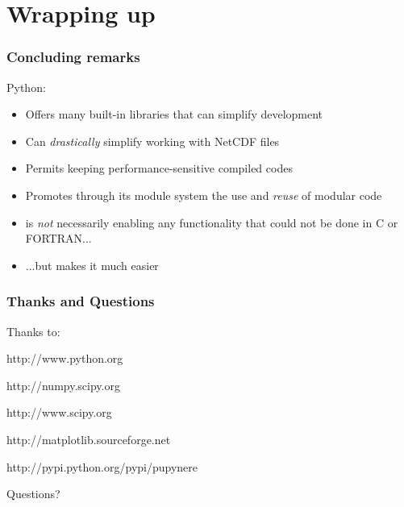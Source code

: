 \documentclass[red, hyperref={pdfpagelabels=false}]{beamer}
\begin{document}
\section{Wrapping up}
\begin{frame}[<+->]
  \frametitle{Concluding remarks}
  Python:
  \begin{itemize}
    \item Offers many built-in libraries that can simplify development
    \item Can \emph{drastically} simplify working with NetCDF files
    \item Permits keeping performance-sensitive compiled codes
    \item Promotes through its module system the use and \emph{reuse} of modular code
    \item is \emph{not} necessarily enabling any functionality that could not be done in C or FORTRAN...
    \item ...but makes it much easier
  \end{itemize}
\end{frame}

\begin{frame}
  \frametitle{Thanks and Questions}
  Thanks to:
  \begin{description}[Matplotlib]
    \item[Python]{http://www.python.org}
    \item[NumPy]{http://numpy.scipy.org}
    \item[SciPy]{http://www.scipy.org}
    \item[Matplotlib]{http://matplotlib.sourceforge.net}
    \item[pupynere]{http://pypi.python.org/pypi/pupynere}
  \end{description}
  Questions?
\end{frame}
\end{document}

